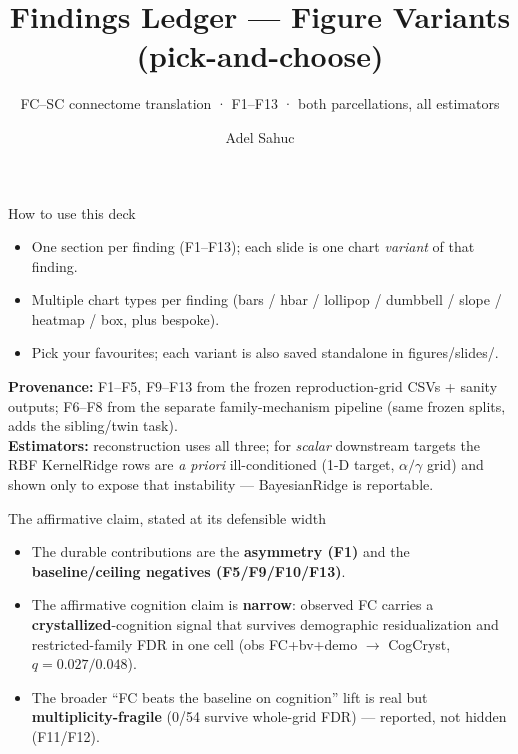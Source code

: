 \documentclass[aspectratio=169]{beamer}
\title{Findings Ledger — Figure Variants (pick-and-choose)}
\subtitle{FC--SC connectome translation · F1--F13 · both parcellations, all estimators}
\author{Adel Sahuc}
\date{}
\begin{document}
\frame{\titlepage}
\begin{frame}{How to use this deck}
\begin{itemize}
\item One section per finding (F1--F13); each slide is one chart \emph{variant} of that finding.
\item Multiple chart types per finding (bars / hbar / lollipop / dumbbell / slope / heatmap / box, plus bespoke).
\item Pick your favourites; each variant is also saved standalone in figures/slides/.
\end{itemize}
\vfill\footnotesize
\textbf{Provenance:} F1--F5, F9--F13 from the frozen reproduction-grid CSVs + sanity outputs; F6--F8 from the separate family-mechanism pipeline (same frozen splits, adds the sibling/twin task).\\[2pt]
\textbf{Estimators:} reconstruction uses all three; for \emph{scalar} downstream targets the RBF KernelRidge rows are \emph{a priori} ill-conditioned (1-D target, $\alpha/\gamma$ grid) and shown only to expose that instability --- BayesianRidge is reportable.
\end{frame}
\begin{frame}{The affirmative claim, stated at its defensible width}
\begin{itemize}
\item The durable contributions are the \textbf{asymmetry (F1)} and the \textbf{baseline/ceiling negatives (F5/F9/F10/F13)}.
\item The affirmative cognition claim is \textbf{narrow}: observed FC carries a \textbf{crystallized}-cognition signal that survives demographic residualization and restricted-family FDR in one cell (obs FC+bv+demo $\rightarrow$ CogCryst, $q=0.027/0.048$).
\item The broader ``FC beats the baseline on cognition'' lift is real but \textbf{multiplicity-fragile} (0/54 survive whole-grid FDR) --- reported, not hidden (F11/F12).
\end{itemize}
\end{frame}
\end{document}
